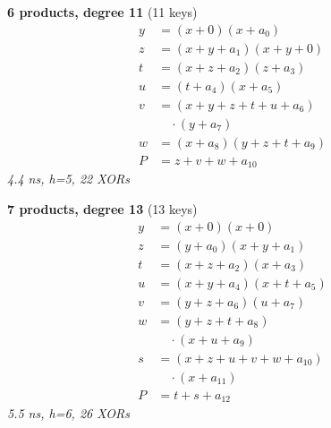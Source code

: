 \medskip
\noindent
\begin{minipage}[t]{0.47\textwidth}
\textbf{6 products, degree 11} (11 keys)
\[
\begin{aligned}
y &= (x + 0)(x + a_0) \\
z &= (x + y + a_1)(x + y + 0) \\
t &= (x + z + a_2)(z + a_3) \\
u &= (t + a_4)(x + a_5) \\
v &= (x + y + z + t + u + a_6) \\
  &\quad\cdot(y + a_7) \\
w &= (x + a_8)(y + z + t + a_9) \\
P &= z + v + w + a_{10}
\end{aligned}
\]
\emph{4.4 ns, h=5, 22 XORs}
\end{minipage}
\hfill
\begin{minipage}[t]{0.47\textwidth}
\textbf{7 products, degree 13} (13 keys)
\[
\begin{aligned}
y &= (x + 0)(x + 0) \\
z &= (y + a_0)(x + y + a_1) \\
t &= (x + z + a_2)(x + a_3) \\
u &= (x + y + a_4)(x + t + a_5) \\
v &= (y + z + a_6)(u + a_7) \\
w &= (y + z + t + a_8) \\
  &\quad\cdot(x + u + a_9) \\
s &= (x + z + u + v + w + a_{10}) \\
  &\quad\cdot(x + a_{11}) \\
P &= t + s + a_{12}
\end{aligned}
\]
\emph{5.5 ns, h=6, 26 XORs}
\end{minipage}

